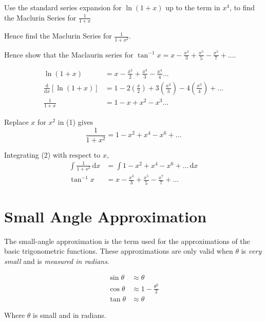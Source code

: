 \documentclass[11pt,a4paper]{book}
\begin{document}
\begin{example}

Use the standard series expansion for $\ln\left(1+x\right)$ up to
the term in $x^{4}$, to find the Maclurin Series for ${\displaystyle \frac{1}{1+x}}$ 

Hence find the Maclurin Series for ${\displaystyle \frac{1}{1+x^{2}}}$.

Hence show that the Maclaurin series for ${\displaystyle \tan^{-1}x=x-\frac{x^{3}}{3}+\frac{x^{5}}{5}-\frac{x^{7}}{7}+\ldots}$.

\Solution

\begin{align*}
\ln\left(1+x\right) & =x-\frac{x^{2}}{2}+\frac{x^{3}}{3}-\frac{x^{4}}{4}\ldots\\
\frac{\mathrm{d}}{\mathrm{d}x}\left[\ln\left(1+x\right)\right] & =1-2\left(\frac{x}{2}\right)+3\left(\frac{x^{2}}{3}\right)-4\left(\frac{x^{3}}{4}\right)+\ldots\\
{\displaystyle \frac{1}{1+x}} & =1-x+x^{2}-x^{3}\ldots\tag{1}
\end{align*}

Replace $x$ for $x^{2}$ in (1) gives
\[
\frac{1}{1+x^{2}}=1-x^{2}+x^{4}-x^{6}+\ldots\tag{2}
\]

Integrating (2) with respect to $x$, 
\begin{align*}
\int\frac{1}{1+x^{2}}\,\mathrm{d}x & =\int1-x^{2}+x^{4}-x^{6}+\ldots\,\mathrm{d}x\\
\tan^{-1}x & =x-\frac{x^{3}}{3}+\frac{x^{5}}{5}-\frac{x^{7}}{7}+\ldots
\end{align*}

\end{example}

\newpage

\section{Small Angle Approximation}

The small-angle approximation is the term used for the approximations
of the basic trigonometric functions. These approximations are only
valid when $\theta$ is \textit{very small} and is \textit{measured
in radians}.

\begin{tcolorbox}[colback=blue!5, colframe=black, boxrule=.4pt, sharpish corners]

\begin{align*}
\sin\theta & \approx\theta\\
\cos\theta & \approx1-\frac{\theta^{2}}{2}\\
\tan\theta & \approx\theta
\end{align*}

Where $\theta$ is small and in radians.
\end{tcolorbox}
\end{document}
